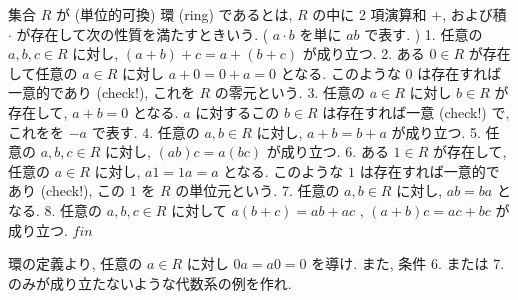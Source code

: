 \documentclass[openany, a4paper, oneside]{jsbook}
\begin{document}
\begin{defn}[(可換) 環]
集合 $R$ が (単位的可換) 環 (ring) であるとは,
$R$ の中に 2 項演算和 $+$, および積 $\cdot$ が存在して次の性質を満たすときいう.
( $a \cdot b$ を単に $ab$ で表す. )
1. 任意の $a,b,c \in R$ に対し,  $(a + b) + c = a + (b + c)$ が成り立つ.
2. ある $0 \in R$ が存在して任意の $a \in R$ に対し $a+0=0+a=0$ となる.
   このような $0$ は存在すれば一意的であり (check!), これを $R$ の零元という.
3. 任意の $a \in R$ に対し $b \in R$ が存在して, $a+b=0$ となる.
   $a$ に対するこの $b \in R$ は存在すれば一意 (check!) で, これをを $-a$ で表す.
4. 任意の $a,b \in R$ に対し,  $a+b=b+a$ が成り立つ.
5. 任意の $a,b,c \in R$ に対し,  $(ab) c=a (bc)$ が成り立つ.
6. ある $1 \in R$ が存在して, 任意の $a \in R$ に対し,  $a1=1a=a$ となる.
   このような $1$ は存在すれば一意的であり (check!), この $1$ を $R$ の単位元という.
7. 任意の $a,b \in R$ に対し,  $ab=ba$ となる.
8. 任意の $a,b,c \in R$ に対して $a (b+c)=ab+ac$ ,  $(a+b) c=ac+bc$ が成り立つ. $fin$
\end{defn}
\begin{exercise}
環の定義より, 任意の $a \in R$ に対し $0a=a0=0$ を導け.
また, 条件 6. または 7. のみが成り立たないような代数系の例を作れ. \fin
\end{exercise}
\end{document}
